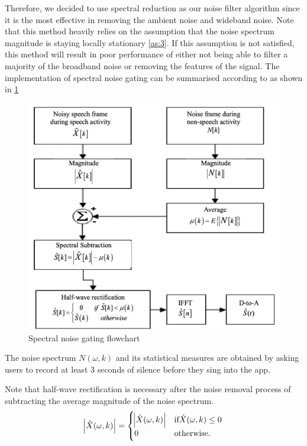 Therefore, we decided to use spectral reduction as our noise filter algorithm since it is the most effective in removing the ambient noise 
and wideband noise. Note that this method heavily relies on the assumption that the noise spectrum magnitude is staying locally 
stationary \cref{as:3}. If this assumption is not satisfied, this method will result in poor performance of either not being able to filter a majority of 
the broadband noise or removing the features of the signal.
The implementation of spectral noise gating can be summarised according to \cite{spectralflowchart} as shown in \cref{spectralflowchart}
\begin{figure}
	\centering
	\includegraphics[scale=0.35]{Figures/spectralprocess.png}
	\caption{Spectral noise gating flowchart}
	\label{spectralflowchart}
\end{figure}
The noise spectrum $N(\omega,k)$ and its statistical measures are obtained by asking users to record at least 3 seconds of silence 
before they sing into the app.

Note that half-wave rectification is necessary after the noise removal process of subtracting the average magnitude of the noise spectrum. 
\begin{equation}
    \abs{\hat{X}(\omega,k)} = \begin{cases}
        \abs{\hat{X}(\omega,k)}   & \text{if} \hat{X}(\omega,k) \leq 0\\
        0                     & \text{otherwise.}
    \end{cases}
\end{equation}

